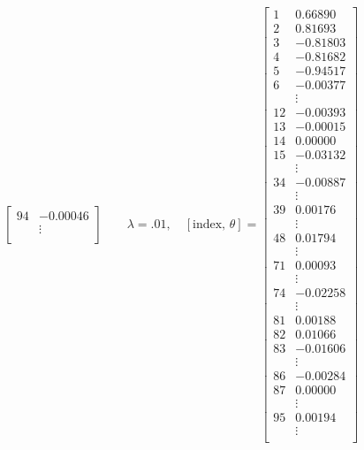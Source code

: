 \documentclass[11pt]{article}
\begin{document}
\begin{align*}
\begin{bmatrix}
        94  &    -0.00046 \\
            & \vdots \\
    \end{bmatrix}
    \quad\quad
    \lambda = .01, \quad
    [\text{index, } \theta] = 
    \begin{bmatrix}
        1  &       0.66890 \\
        2  &       0.81693 \\
        3  &      -0.81803 \\
        4  &      -0.81682 \\
        5  &      -0.94517 \\
        6  &      -0.00377 \\
            & \vdots  \\
        12  &     -0.00393 \\
        13  &     -0.00015 \\
        14  &      0.00000 \\
        15  &     -0.03132 \\
            & \vdots \\
        34  &     -0.00887 \\
            & \vdots \\
        39  &      0.00176 \\
            & \vdots \\
        48  &      0.01794 \\
            & \vdots \\
        71  &      0.00093 \\
            & \vdots \\
        74  &     -0.02258 \\
            & \vdots \\
        81  &      0.00188 \\
        82  &      0.01066 \\
        83  &     -0.01606 \\
            & \vdots \\
        86  &     -0.00284 \\
        87  &      0.00000 \\
            & \vdots \\
        95  &      0.00194 \\
            & \vdots \\
    \end{bmatrix}
\end{align*}
\end{document}
